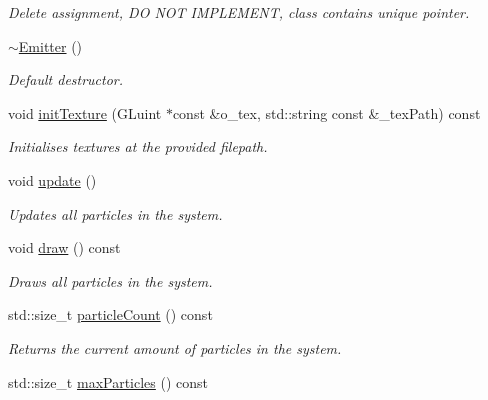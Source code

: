 \begin{DoxyCompactItemize}
\begin{DoxyCompactList}\small\item\em Delete assignment, D\-O N\-O\-T I\-M\-P\-L\-E\-M\-E\-N\-T, class contains unique pointer. \end{DoxyCompactList}\item 
\hypertarget{classEmitter_a0af9a50316daf2580cde9b99fe7c6f96}{\hyperlink{classEmitter_a0af9a50316daf2580cde9b99fe7c6f96}{$\sim$\-Emitter} ()}\label{classEmitter_a0af9a50316daf2580cde9b99fe7c6f96}

\begin{DoxyCompactList}\small\item\em Default destructor. \end{DoxyCompactList}\item 
void \hyperlink{classEmitter_a9fbfc0ce29b00564ff2366aa4c9e10af}{init\-Texture} (G\-Luint $\ast$const \&o\-\_\-tex, std\-::string const \&\-\_\-tex\-Path) const 
\begin{DoxyCompactList}\small\item\em Initialises textures at the provided filepath. \end{DoxyCompactList}\item 
\hypertarget{classEmitter_a2ece709498f9cbbb9d4f8cba2780b0e9}{void \hyperlink{classEmitter_a2ece709498f9cbbb9d4f8cba2780b0e9}{update} ()}\label{classEmitter_a2ece709498f9cbbb9d4f8cba2780b0e9}

\begin{DoxyCompactList}\small\item\em Updates all particles in the system. \end{DoxyCompactList}\item 
\hypertarget{classEmitter_ad0ef8fd3cc8a6d1b8996ec8da041e967}{void \hyperlink{classEmitter_ad0ef8fd3cc8a6d1b8996ec8da041e967}{draw} () const }\label{classEmitter_ad0ef8fd3cc8a6d1b8996ec8da041e967}

\begin{DoxyCompactList}\small\item\em Draws all particles in the system. \end{DoxyCompactList}\item 
\hypertarget{classEmitter_a4b7046dbc627e71f29dbbb17b3ea0415}{std\-::size\-\_\-t \hyperlink{classEmitter_a4b7046dbc627e71f29dbbb17b3ea0415}{particle\-Count} () const }\label{classEmitter_a4b7046dbc627e71f29dbbb17b3ea0415}

\begin{DoxyCompactList}\small\item\em Returns the current amount of particles in the system. \end{DoxyCompactList}\item 
\hypertarget{classEmitter_a64b6f240ca3d13e60789d92bbfe4d517}{std\-::size\-\_\-t \hyperlink{classEmitter_a64b6f240ca3d13e60789d92bbfe4d517}{max\-Particles} () const }\label{classEmitter_a64b6f240ca3d13e60789d92bbfe4d517}


\end{DoxyCompactItemize}
